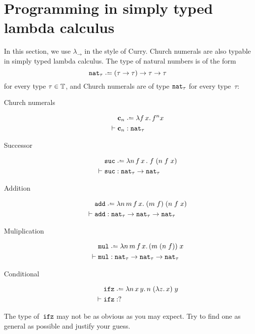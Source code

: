 \section{Programming in simply typed lambda calculus}
In this section, we use $\lambda_\to$ in the style of Curry.  
Church numerals are also typable in simply typed lambda calculus.
The type of natural numbers is of the form
\[
  \nat_\tau \defeq (\tau \to \tau) \to \tau \to \tau
\]
for every type $\tau \in \mathbb{T}$, and Church
numerals are of type $\mathtt{nat}_\tau$ for every type~$\tau$:
  \begin{description}
    \item[Church numerals]
      \begin{align*}
        & \bc_n \defeq \lambda f\,x.\,
        f^n x \\
        \vdash{} & \bc_n : \nat_\tau
      \end{align*}
    \item[Successor]
      \begin{align*}
        & \suc \defeq \lambda n \,f\,x\,.\;f\;(n\;f\;x) \\
        \vdash{} & \suc : \nat_\tau \to \nat_\tau
      \end{align*}
    \item[Addition]
      \begin{align*}
        & \add \defeq \lambda n\,m\,f\,x.\; (m\;f)\;(n\;f\;x) \\
        \vdash{} & \add : \nat_\tau \to \nat_\tau \to \nat_\tau
      \end{align*}
    \item[Muliplication] 
      \begin{align*}
        & \mul \defeq \lambda n\,m\,f\,x.\, (m\;(n\;f))\;x\\
      \vdash{} & \mul : \nat_\tau \to \nat_\tau \to \nat_\tau
      \end{align*}
    \item[Conditional]
      \begin{align*}
        & \ifz \defeq \lambda n\,x\,y.\, n\;(\lambda z.\, x)\;y\\
        \vdash {} & \ifz : ?
      \end{align*}
  \end{description}
The type of~$\mathtt{ifz}$ may not be as obvious as you may expect.
Try to find one as general as possible and justify your guess.

